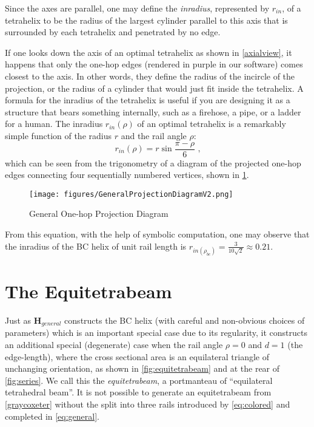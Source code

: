 \documentclass[10pt,final]{journals-1.0/asme2ej}
\renewcommand{\vec}[1]{\mathbf{#1}}
\begin{document}
Since the axes are parallel, one may define the \emph{inradius}, represented by $r_{in}$, of a
tetrahelix to be the radius of the largest
cylinder parallel to this axis that is surrounded by each tetrahelix and penetrated by no edge.


If one looks down the axis of an optimal tetrahelix as shown in \cref{axialview}, it happens that only
the one-hop edges
(rendered in purple in our software)
comes closest to the axis. In other words, they define the radius of the incircle of the
projection, or the radius of a cylinder that would just fit inside the tetrahelix.
A formula for the inradius of the tetrahelix is useful if you are designing it as a structure that bears something internally,
such as a firehose, a pipe, or
a ladder for a human. The inradius $r_{in}(\rho)$ of
an optimal tetrahelix is a remarkably simple function of the radius $r$ and the rail angle $\rho$:
\begin{equation}
  \label{eq:inradius}
  r_{in}(\rho) = r \sin{\frac{\pi - \rho}{6}} \text{ ,}
\end{equation}
which can be seen from the trigonometry of a diagram of the projected one-hop edges
connecting four sequentially numbered vertices, shown in \cref{fig:projectiondiagram}.

\begin{figure}
     \centering
     \texttt{[image: figures/GeneralProjectionDiagramV2.png]}
     \caption{General One-hop Projection Diagram}
  \label{fig:projectiondiagram}
\end{figure}

From this equation, with the help of symbolic computation, one may observe that the inradius of the BC helix of unit rail length is $r_{in(\rho_{bc})} = \frac{3}{10\sqrt{2}} \approx 0.21$.

\section{The Equitetrabeam}
\label{sec:equitetrabeam}

Just as $\vec{H}_{general}$ constructs the BC helix (with careful and non-obvious choices of parameters)
which is an important
special case due to its regularity, it constructs an additional special
(degenerate) case when the rail angle $\rho = 0$
and $d = 1$ (the edge-length), where the cross sectional area is
an equilateral triangle of unchanging orientation, as shown in \cref{fig:equitetrabeam} and at the rear of \cref{fig:series}.
We call this the \emph{equitetrabeam}, a portmanteau of ``equilateral tetrahedral beam''.
It is not possible to generate an equitetrabeam from 
\cref{graycoxeter}
without the split into three rails introduced by \cref{eq:colored} and completed in  \cref{eq:general}.
\end{document}
